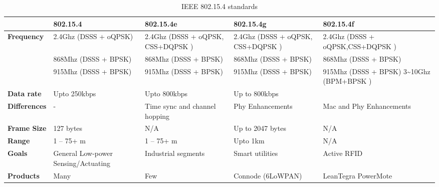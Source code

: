\begin{table}[h!]
\scriptsize
	\begin{tabulary}{\textwidth}{|p{6em}|L|L|L|L|}
	\                           & \textbf{802.15.4}                   & \textbf{802.15.4e}                       & \textbf{802.15.4g}                & \textbf{802.15.4f}                      \\\hline
	\textbf{Frequency}          & 2.4Ghz (DSSS + oQPSK)               & 2.4Ghz (DSSS + oQPSK, CSS+DQPSK )        & 2.4Ghz (DSSS + oQPSK, CSS+DQPSK ) & 2.4Ghz (DSSS + oQPSK,CSS+DQPSK )        \\
	\                           & 868Mhz (DSSS + BPSK)                & 868Mhz (DSSS + BPSK)                     & 868Mhz (DSSS + BPSK)              & 868Mhz (DSSS + BPSK)                    \\
	\                           & 915Mhz (DSSS + BPSK)                & 915Mhz (DSSS + BPSK)                     & 915Mhz (DSSS + BPSK)              & 915Mhz (DSSS + BPSK) 3\sim 10Ghz (BPM+BPSK )\\
	\textbf{Data rate}          & Upto 250kbps                        & Upto 800kbps                             & Up to 800kbps                     &                                         \\
	\textbf{Differences}        & -                                   & Time sync and channel hopping            & Phy Enhancements                  & Mac and Phy Enhancements                \\
	\textbf{Frame Size}         & 127 bytes                           & N/A                                      & Up to 2047 bytes                  & N/A                                     \\
	\textbf{Range}              & 1 – 75+ m                           & 1 – 75+ m                                & Upto 1km                          & N/A                                     \\
	\textbf{Goals}              & General Low-power Sensing/Actuating & Industrial segments                      & Smart utilities                   & Active RFID                             \\
	\textbf{Products}           & Many                                & Few                                      & Connode (6LoWPAN)                 & LeanTegra PowerMote                     \\\hline
	\end{tabulary}
\caption{\label{tab:IEEE_802.15.4_standards} IEEE 802.15.4 standards \cite{sarwar_iot_}}
\end{table}

